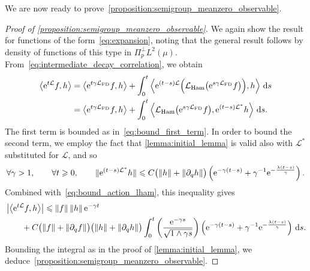 \documentclass[11pt,a4paper]{article}
\newcommand{\e}{\mathrm{e}}
\renewcommand{\d}{\mathrm d}
\theoremstyle{plain}
\numberwithin{equation}{section}
\renewcommand{\leq}{\leqslant}
\renewcommand{\geq}{\geqslant}
\begin{document}
We are now ready to prove~\cref{proposition:semigroup_meanzero_observable}.
\begin{proof}
    [Proof of \cref{proposition:semigroup_meanzero_observable}]
    We again show the result for functions of the form~\eqref{eq:expansion},
    noting that the general result follows by density of functions of this type in $\Pi_p^{\perp} L^2(\mu)$.
    From~\eqref{eq:intermediate_decay_correlation}, we obtain
    \begin{align}
        \notag
        \ip{\e^{t \mathcal L} f}{h}
        &= \ip{\e^{t \gamma \mathcal L_{\rm FD}} f}{h}
        + \int_{0}^t \ip{\e^{(t-s) \mathcal L} \Bigl( \mathcal L_{\rm Ham} \bigl(\e^{s \gamma \mathcal L_{\rm FD}} f\bigr) \Bigr)}{h} \, \d s \\
        &= \ip{\e^{t \gamma \mathcal L_{\rm FD}} f}{h}
        + \int_{0}^t \ip{ \mathcal L_{\rm Ham} \bigl(\e^{s \gamma \mathcal L_{\rm FD}} f\bigr) }{\e^{(t-s) \mathcal L^*}  h} \, \d s.
    \end{align}
    The first term is bounded as in~\eqref{eq:bound_first_term}.
    In order to bound the second term,
    we employ the fact that \cref{lemma:initial_lemma} is valid also with $\mathcal L^*$ substituted for $\mathcal L$,
    and so
    \[
        \forall \gamma > 1, \qquad
        \forall t \geq 0, \qquad
        \norm*{\e^{(t-s)\mathcal L^*} h}
        \leq C \bigl( \norm{h} + \norm{\partial_q h} \bigr)
        \left( \e^{- \gamma (t-s)} + \gamma^{-1} \e^{-\frac{\lambda (t-s)}{\gamma}} \right).
    \]
    Combined with~\eqref{eq:bound_action_lham},
    this inequality gives
    \begin{align*}
        & \abs{ \ip{\e^{t \mathcal L} f}{h}}
        \leq \norm{f} \norm{h} \e^{-\gamma t} \\
        & \qquad + C \bigl( \norm{f} + \norm{\partial_q f} \bigr) \bigl( \norm{h} + \norm{\partial_q h} \bigr)
         \int_{0}^{t}  \left( \frac{\e^{-\gamma s}}{\sqrt{1 \wedge \gamma s}} \right)
         \left(  \e^{- \gamma (t-s)} + \gamma^{-1} \e^{-\frac{\lambda (t-s)}{\gamma}} \right) \, \d s.
    \end{align*}
    Bounding the integral as in the proof of \cref{lemma:initial_lemma},
    we deduce~\cref{proposition:semigroup_meanzero_observable}.
\end{proof}
\end{document}
